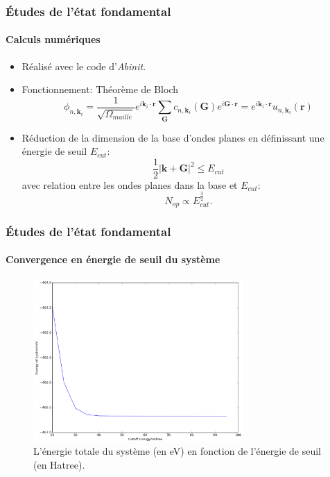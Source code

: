 \documentclass[a4paper, 12pt, twoside, titlepage, french]{beamer}
\begin{document}
\begin{frame}
\frametitle{Études de l'état fondamental}
\framesubtitle{Calculs numériques}
\begin{itemize}
\item Réalisé avec le code d'\textit{Abinit}.
\item Fonctionnement:
Théorème de Bloch
\begin{equation*}
  \phi_{n,\textbf{k}_i}
  = \frac{1}{\sqrt{\Omega_{maille}}}e^{i\textbf{k}_i\cdot\textbf{r}}\sum_{\textbf{G}} c_{n,\textbf{k}_i}(\textbf{G})e^{i\textbf{G}\cdot\textbf{r}}
  = e^{i\textbf{k}_i\cdot\textbf{r}} u_{n,\textbf{k}_i}(\textbf{r})
\end{equation*}
\item Réduction de la dimension de la base d'ondes planes en définissant une énergie de seuil $E_{cut}$:
   	\begin{equation}
      \frac{1}{2}|\textbf{k}+\textbf{G}|^2 \leq E_{cut}
	\end{equation}    
    avec relation entre les ondes planes dans la base et $E_{cut}$:
    \begin{equation}
      N_{op}\propto E_{cut}^{\frac{3}{2}}.
    \end{equation}
 

\end{itemize}

\end{frame}

\begin{frame}
\frametitle{Études de l'état fondamental}
\framesubtitle{Convergence en énergie de seuil du système}
\begin{figure}[!h]
    \centering
    \includegraphics[width=8cm]{E_cut}
    \caption{L'énergie totale du système (en eV) en fonction de l'énergie de seuil (en Hatree).}\label{fig-Ecut}
\end{figure}
\end{frame}
\end{document}
